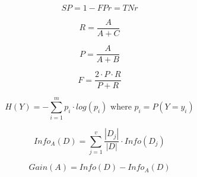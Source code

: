 \documentclass[10pt]{book}
\begin{document}
\begin{mdSnippets}
\begin{mdDisplaySnippet}
\[  SP = 1 - FPr = TNr
\]%
\end{mdDisplaySnippet}%
\begin{mdDisplaySnippet}[ba82f48a43ef0894d62cc5c64647ffde]%
\[%
  R = \frac{A}{A+C}
\]%
\end{mdDisplaySnippet}%
\begin{mdDisplaySnippet}%
\[%
  P = \frac{A}{A+B}
\]%
\end{mdDisplaySnippet}%
\begin{mdDisplaySnippet}[ed20a79ddbdd6c86e3ce04fd31c21666]%
\[%
  F = \frac{2 \cdot P \cdot R}{P + R}
\]%
\end{mdDisplaySnippet}%
\begin{mdDisplaySnippet}[3274f67c0f14a01faf1c72d1c8c33393]%
\[%
H(Y) = -\sum_{i=1}^m p_i \cdot log(p_i) \text{ where } p_i = P(Y=y_i)
\]%
\end{mdDisplaySnippet}%
\begin{mdDisplaySnippet}%
\[%
  Info_A(D) = \sum_{j=1}^{v} \frac{|D_j|}{|D|} \cdot Info(D_j)
\]%
\end{mdDisplaySnippet}%
\begin{mdDisplaySnippet}[9b503ca4d3347f05c2988351b9a864aa]%
\[%
  Gain(A) = Info(D) - Info_A(D)
\]%
\end{mdDisplaySnippet}%

\end{mdSnippets}
\end{document}
